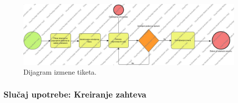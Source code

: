 \documentclass[a4paper]{article}
\begin{document}
\begin{figure} [!ht]
    \begin{center}
        \includegraphics[width=\textwidth,height=\textheight,keepaspectratio]{Korisnici/Zaposleni/UML/IzmenaTiketa.jpg}
    \end{center}
\caption{Dijagram izmene tiketa.}
\end{figure}

\subsubsection{Slučaj upotrebe: Kreiranje zahteva}
\end{document}
